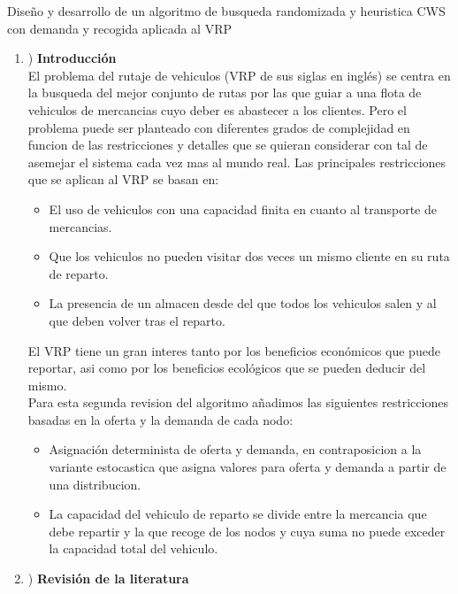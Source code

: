 \documentclass[11pt]{article} %
\begin{document}
\clearpage

{\fontsize{50}{60}\selectfont Diseño y desarrollo de un algoritmo de busqueda randomizada y heuristica CWS con demanda y recogida aplicada al VRP}

\renewcommand{\labelenumi}{\arabic{enumi}}
 \begin{enumerate}
   \item) \textbf{Introducción}\\[0.2cm]
El problema del rutaje de vehiculos (VRP de sus siglas en inglés) se centra en la busqueda del mejor conjunto de rutas por las que guiar a una flota de vehiculos de mercancias cuyo deber es abastecer a los clientes. Pero el problema puede ser planteado con diferentes grados de complejidad en funcion de las restricciones y detalles que se quieran considerar con tal de asemejar el sistema cada vez mas al mundo real. Las principales restricciones que se aplican al VRP se basan en:
   \begin{itemize}
       \item El uso de vehiculos con una capacidad finita en cuanto al transporte de mercancias.
       \item Que los vehiculos no pueden visitar dos veces un mismo cliente en su ruta de reparto.
       \item La presencia de un almacen desde del que todos los vehiculos salen y al que deben volver tras el reparto.
   \end{itemize} 
El VRP tiene un gran interes tanto por los beneficios económicos que puede reportar, asi como por los beneficios ecológicos que se pueden deducir del mismo.\\

Para esta segunda revision del algoritmo añadimos las siguientes restricciones basadas en la oferta y la demanda de cada nodo:
   \begin{itemize}
	\item Asignación determinista de oferta y demanda, en contraposicion a la variante estocastica que asigna valores para oferta y demanda a partir de una distribucion.
	\item La capacidad del vehiculo de reparto se divide entre la mercancia que debe repartir y la que recoge de los nodos y cuya suma no puede exceder la capacidad total del vehiculo.
   \end{itemize} 

   \item) \textbf{Revisión de la literatura}\\[0.2cm]


\end{enumerate}
\end{document}
